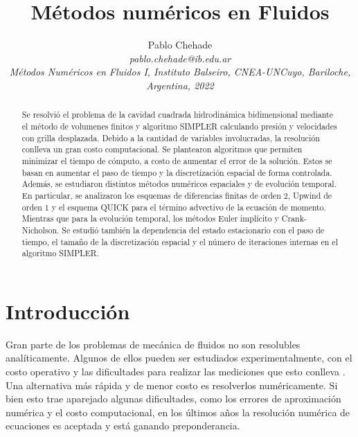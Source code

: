 \documentclass[aps,prb,twocolumn,superscriptaddress,floatfix,longbibliography,10pt]{revtex4-2}
\newif\ifptitle
\newif\ifpnumber
\newcounter{para}
\newcommand\ptitle[1]{\par\refstepcounter{para}
{\ifpnumber{\noindent\textcolor{lightgray}{\textbf{\thepara}}\indent}\fi}
{\ifptitle{\textbf{[{#1}]}}\fi}}
\begin{document}
\newcommand{\mytitle}{Métodos numéricos en Fluidos}

\title{\mytitle}

\author{Pablo Chehade \\
    \small \textit{pablo.chehade@ib.edu.ar} \\
    \small \textit{Métodos Numéricos en Fluidos I, Instituto Balseiro, CNEA-UNCuyo, Bariloche, Argentina, 2022} \\}


\begin{abstract}

Se resolvió el problema de la cavidad cuadrada hidrodinámica bidimensional mediante el método de volumenes finitos y algoritmo SIMPLER calculando presión y velocidades con grilla desplazada. Debido a la cantidad de variables involucradas, la resolución conlleva un gran costo computacional. Se plantearon algoritmos que permiten minimizar el tiempo de cómputo, a costo de aumentar el error de la solución. Estos se basan en aumentar el paso de tiempo y la discretización espacial de forma controlada. Además, se estudiaron distintos métodos numéricos espaciales y de evolución temporal. En particular, se analizaron los esquemas de diferencias finitas de orden 2, Upwind de orden 1 y el esquema QUICK para el término advectivo de la ecuación de momento. Mientras que para la evolución temporal, los métodos Euler implícito y Crank-Nicholson. Se estudió también la dependencia del estado estacionario con el paso de tiempo, el tamaño de la discretización espacial y el número de iteraciones internas en el algoritmo SIMPLER.



\end{abstract}

\maketitle

\section{Introducción}

\ptitle{¿Por qué es importante resolver problemas de fluidos numéricamente? Rtas en la primera clase}

Gran parte de los problemas de mecánica de fluidos no son resolubles analíticamente. Algunos de ellos pueden ser estudiados experimentalmente, con el costo operativo y las dificultades para realizar las mediciones que esto conlleva \cite{Notas_materia}. Una alternativa más rápida y de menor costo es resolverlos numéricamente. Si bien esto trae aparejado algunas dificultades, como los errores de aproximación numérica y el costo computacional, en los últimos años la resolución numérica de ecuaciones es aceptada y está ganando preponderancia.
\end{document}
